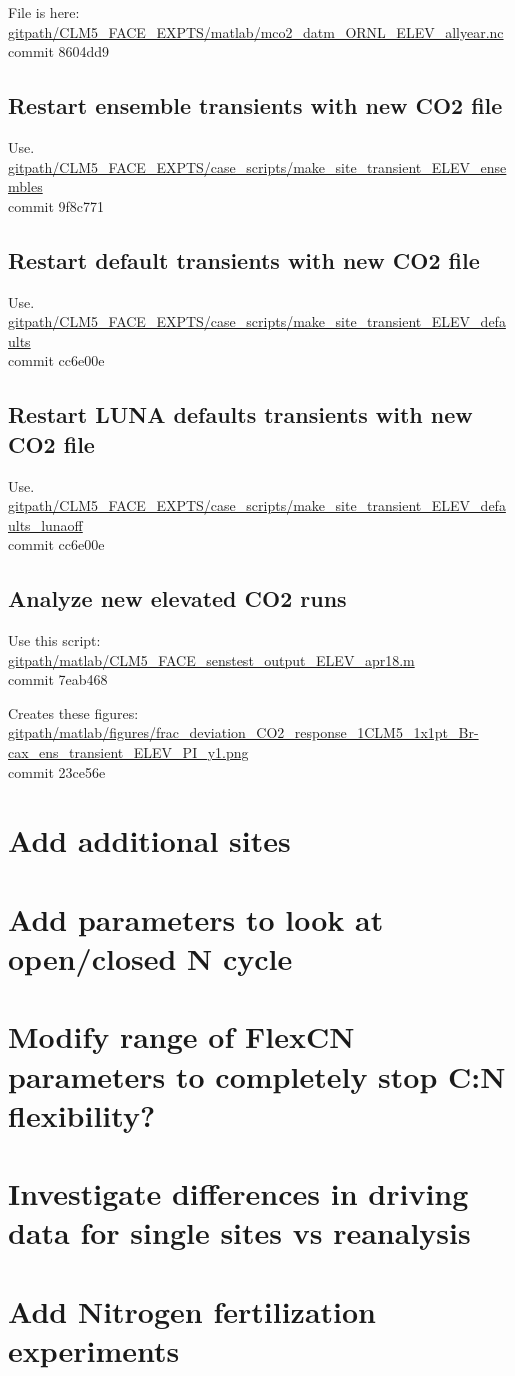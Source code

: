 \documentclass{article}
\begin{document}
File is here: 
{\color{red}\small{\url{gitpath/CLM5_FACE_EXPTS/matlab/mco2_datm_ORNL_ELEV_allyear.nc }} }\\
commit 8604dd9  

\subsection{Restart ensemble transients with new CO2 file}
Use.\\
{\color{blue}\small{\url{gitpath/CLM5_FACE_EXPTS/case_scripts/make_site_transient_ELEV_ensembles}}}\\
commit 9f8c771  

\subsection{Restart default transients with new CO2 file}
Use.\\
{\color{blue}\small{\url{gitpath/CLM5_FACE_EXPTS/case_scripts/make_site_transient_ELEV_defaults}}}\\
commit cc6e00e    

\subsection{Restart LUNA defaults transients with new CO2 file}
Use.\\
{\color{blue}\small{\url{gitpath/CLM5_FACE_EXPTS/case_scripts/make_site_transient_ELEV_defaults_lunaoff}}}\\
commit cc6e00e   

\subsection{Analyze new elevated CO2 runs}
Use this script:\\
{\color{blue}\small{\url{gitpath/matlab/CLM5_FACE_senstest_output_ELEV_apr18.m}}}\\
commit  7eab468  

Creates these figures:
{\color{magenta}\small{\url{gitpath/matlab/figures/frac_deviation_CO2_response_1CLM5_1x1pt_Br-cax_ens_transient_ELEV_PI_y1.png}}}\\
commit 23ce56e


\section{Add additional sites}

\section{Add parameters to look at open/closed N cycle}

\section{Modify range of FlexCN parameters to completely stop C:N flexibility?}

\section{Investigate differences in driving data for single sites vs reanalysis}

\section{Add Nitrogen fertilization experiments}
\end{document}
